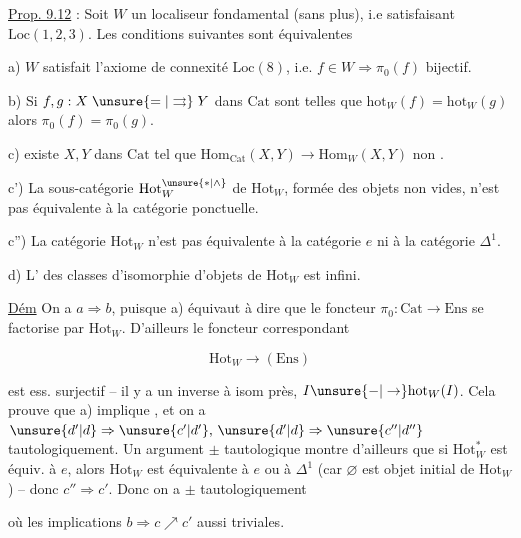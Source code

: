 
\uline{Prop. 9.12} : Soit $W$ un localiseur fondamental (sans plus),
i.e satisfaisant $\mathrm{Loc}(1,2,3)$.  Les conditions
suivantes sont équivalentes

a) $W$ satisfait l'axiome de connexité $\mathrm{Loc}(8)$, i.e.
$f\in W\Longrightarrow\pi_0(f)$ bijectif.

b) Si $f,g:X\mathrel{\unsure{=|\rightrightarrows}}Y$ dans $\mathrm{Cat}$ sont telles que $\mathrm{hot}_{W}(f)=\mathrm{hot}_{W}(g)$
alors $\pi_0(f)=\pi_0(g)$.

c)  existe $X,Y$ dans $\mathrm{Cat}$ tel que  $\mathrm{Hom}_{\mathrm{Cat}}(X,Y)\to\mathrm{Hom}_{W}(X,Y)$ non .

c') La sous-catégorie $\mathrm{Hot}_{W}^{\unsure{*|\wedge}}$  de $\mathrm{Hot}_{W}$, formée des
objets  non vides, n'est pas équivalente à la catégorie
ponctuelle.

c'') La catégorie $\mathrm{Hot}_{W}$ n'est pas équivalente à la
catégorie $e$ ni à la catégorie $\Delta^1$.

d) L' des classes d'isomorphie d'objets de
$\mathrm{Hot}_{W}$ est infini.

\uline{Dém} On a $a\Longrightarrow b$, puisque a) équivaut à dire
que le foncteur $\pi_0:\mathrm{Cat}\to\mathrm{Ens}$ se factorise
par $\mathrm{Hot}_{W}$. D'ailleurs le foncteur correspondant

\[
 \mathrm{Hot}_{W}\longrightarrow(\mathrm{Ens})
\]

est ess. surjectif -- il y a un inverse à isom
près, $I\unsure{-|\to}\mathrm{hot}_{W}(I)$. Cela prouve que
a) implique , et on a $\unsure{d'|d}\Rightarrow\unsure{c'|d'},\,\unsure{d'|d}\Rightarrow\unsure{c''|d''}$
tautologiquement. Un argument $\pm$ tautologique
montre d'ailleurs que si $\mathrm{Hot}_{W}^{*}$ est équiv. à $e$,
alors $\mathrm{Hot}_{W}$ est équivalente à $e$ ou à $\Delta^1$
(car $\varnothing$ est objet initial de $\mathrm{Hot}_{W}$) -- donc $c''\Rightarrow c'$.
Donc on a $\pm$ tautologiquement


où les implications $b\Rightarrow c\nearrow c'$  
aussi triviales. 
